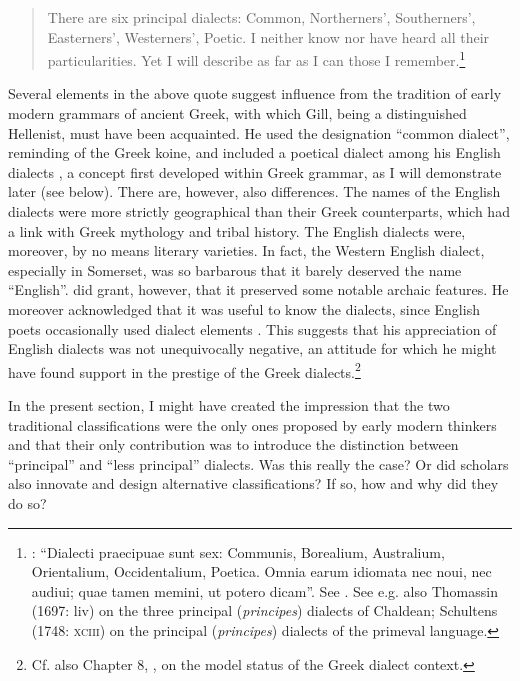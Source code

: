\documentclass[output=paper]{langsci/langscibook}
\begin{document}
\begin{quote}
There are six principal dialects: Common, Northerners’, Southerners’, Easterners’, Westerners’, Poetic. I neither know nor have heard all their particularities. Yet I will describe as far as I can those I remember.\footnote{\citet[15]{Gill1619}: “Dialecti praecipuae sunt sex: Communis, Borealium, Australium, Orientalium, Occidentalium, Poetica. Omnia earum idiomata nec noui, nec audiui; quae tamen memini, ut potero dicam”. See \citet{Kökeritz1938}. See e.g. also Thomassin (1697: liv) on the three principal (\textit{principes}) dialects of Chaldean; Schultens (1748: \textsc{xciii}) on the principal (\textit{principes}) dialects of the primeval language.}
\end{quote}

Several elements in the above quote suggest influence from the tradition of early modern grammars of ancient Greek, with which Gill, being a distinguished Hellenist, must have been acquainted. He used the designation “common dialect”, reminding of the Greek koine, and included a poetical dialect among his English dialects \citep[18]{Gill1619}, a concept first developed within Greek grammar, as I will demonstrate later (see  below). There are, however, also differences. The names of the English dialects were more strictly geographical than their Greek counterparts, which had a link with Greek mythology and tribal history. The English dialects were, moreover, by no means literary varieties. In fact, the Western English dialect, especially in Somerset, was so barbarous that it barely deserved the name “English”. \citet[17]{Gill1619} did grant, however, that it preserved some notable archaic features. He moreover acknowledged that it was useful to know the dialects, since English poets occasionally used dialect elements \citep[18]{Gill1619}. This suggests that his appreciation of English dialects was not unequivocally negative, an attitude for which he might have found support in the prestige of the Greek dialects.\footnote{Cf. also Chapter 8, , on the model status of the Greek dialect context.}

In the present section, I might have created the impression that the two traditional classifications were the only ones proposed by early modern thinkers and that their only contribution was to introduce the distinction between “principal” and “less principal” dialects. Was this really the case? Or did scholars also innovate and design alternative classifications? If so, how and why did they do so?
\end{document}
